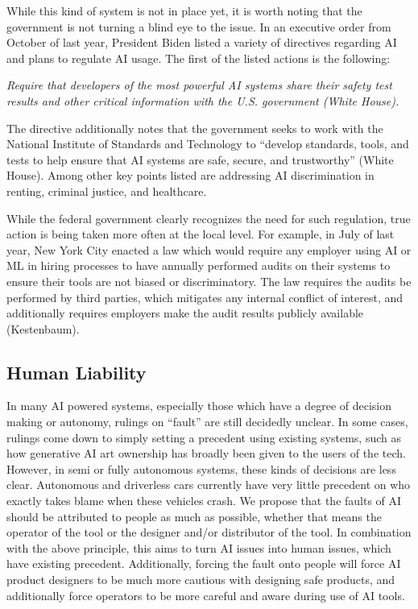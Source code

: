 \documentclass[10pt]{article}
\begin{document}
    While this kind of system is not in place yet, it is worth noting that the government is not turning a blind eye to the issue. In an executive order from October of last year, President Biden listed a variety of directives regarding AI and plans to regulate AI usage. The first of the listed actions is the following:

    \begin{center}
      \textit{Require that developers of the most powerful AI systems share their safety test results and other critical information with the U.S. government (White House).}
    \end{center}

    The directive additionally notes that the government seeks to work with the National Institute of Standards and Technology to “develop standards, tools, and tests to help ensure that AI systems are safe, secure, and trustworthy” (White House). Among other key points listed are addressing AI discrimination in renting, criminal justice, and healthcare.

    While the federal government clearly recognizes the need for such regulation, true action is being taken more often at the local level. For example, in July of last year, New York City enacted a law which would require any employer using AI or ML in hiring processes to have annually performed audits on their systems to ensure their tools are not biased or discriminatory. The law requires the audits be performed by third parties, which mitigates any internal conflict of interest, and additionally requires employers make the audit results publicly available (Kestenbaum).

  \subsection{Human Liability}

    In many AI powered systems, especially those which have a degree of decision making or autonomy, rulings on “fault” are still decidedly unclear. In some cases, rulings come down to simply setting a precedent using existing systems, such as how generative AI art ownership has broadly been given to the users of the tech. However, in semi or fully autonomous systems, these kinds of decisions are less clear. Autonomous and driverless cars currently have very little precedent on who exactly takes blame when these vehicles crash. We propose that the faults of AI should be attributed to people as much as possible, whether that means the operator of the tool or the designer and/or distributor of the tool. In combination with the above principle, this aims to turn AI issues into human issues, which have existing precedent. Additionally, forcing the fault onto people will force AI product designers to be much more cautious with designing safe products, and additionally force operators to be more careful and aware during use of AI tools.
\end{document}
